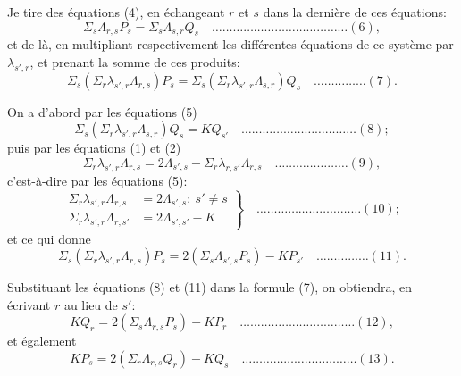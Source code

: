 \documentclass[12pt,a4paper]{article}
\theoremstyle{plain}
\begin{document}
Je tire des \'equations (4), en \'echangeant $r$ et $s$ dans la derni\`ere de ces \'equations:
\[
\Sigma_s \Lambda_{r,s} P_s = \Sigma_s \Lambda_{s,r} Q_s \quad \ldots \ldots \ldots \ldots \ldots \ldots \ldots \ldots \ldots \ldots \ldots \ldots \ldots (6),
\]
et de l\`a, en multipliant respectivement les diff\'erentes \'equations de ce syst\`eme par $\lambda_{s',r}$, et prenant la somme de ces produits:
\[
\Sigma_s (\Sigma_r \lambda_{s',r} \Lambda_{r,s}) P_s = \Sigma_s (\Sigma_r \lambda_{s',r} \Lambda_{s,r}) Q_s \quad \ldots \ldots \ldots \ldots \ldots (7).
\]

On a d'abord par les \'equations (5)
\[
\Sigma_s (\Sigma_r \lambda_{s',r} \Lambda_{s,r}) Q_s = K Q_{s'} \quad \ldots \ldots \ldots \ldots \ldots \ldots \ldots \ldots \ldots \ldots \ldots (8);
\]
puis par les \'equations (1) et (2)
\[
\Sigma_r \lambda_{s',r} \Lambda_{r,s} = 2\Lambda_{s',s} - \Sigma_r \lambda_{r,s'} \Lambda_{r,s} \quad \ldots \ldots \ldots \ldots \ldots \ldots \ldots (9),
\]
c'est-\`a-dire par les \'equations (5):
\[
\left. \begin{aligned}
\Sigma_r \lambda_{s',r} \Lambda_{r,s} &= 2\Lambda_{s',s};\ s' \neq s \\
\Sigma_r \lambda_{s',r} \Lambda_{r,s'} &= 2\Lambda_{s',s'} - K
\end{aligned} \right\} \quad \ldots \ldots \ldots \ldots \ldots \ldots \ldots \ldots \ldots \ldots (10);
\]
et ce qui donne
\[
\Sigma_s (\Sigma_r \lambda_{s',r} \Lambda_{r,s}) P_s = 2(\Sigma_s \Lambda_{s',s} P_s) - K P_{s'} \quad \ldots \ldots \ldots \ldots \ldots (11).
\]

Substituant les \'equations (8) et (11) dans la formule (7), on obtiendra, en \'ecrivant $r$ au lieu de $s'$:
\[
K Q_r = 2(\Sigma_s \Lambda_{r,s} P_s) - K P_r \quad \ldots \ldots \ldots \ldots \ldots \ldots \ldots \ldots \ldots \ldots \ldots (12),
\]
et \'egalement
\[
K P_s = 2(\Sigma_r \Lambda_{r,s} Q_r) - K Q_s \quad \ldots \ldots \ldots \ldots \ldots \ldots \ldots \ldots \ldots \ldots \ldots (13).
\]
\end{document}
